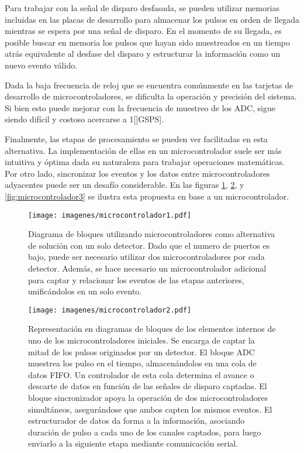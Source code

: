 \par Para trabajar con la señal de disparo desfasada, se pueden utilizar memorias incluidas en las placas de desarrollo para almacenar los pulsos en orden de llegada mientras se espera por una señal de disparo. En el momento de su llegada, es posible buscar en memoria los pulsos que hayan sido muestreados en un tiempo atrás equivalente al desfase del disparo y estructurar la información como un nuevo evento válido.

\par Dada la baja frecuencia de reloj que se encuentra comúnmente en las tarjetas de desarrollo de microcontroladores, se dificulta la operación y precisión del sistema. Si bien esto puede mejorar con la frecuencia de muestreo de los ADC, sigue siendo difícil y costoso acercarse a 1[]GSPS].

\par Finalmente, las etapas de procesamiento se pueden ver facilitadas en esta alternativa. La implementación de ellas en un microcontrolador suele ser más intuitiva y óptima dada su naturaleza para trabajar operaciones matemáticas. Por otro lado, sincronizar los eventos y los datos entre microcontroladores adyacentes puede ser un desafío considerable. En las figuras \ref{fig:microcontrolador1}, \ref{fig:microcontrolador2}, y \ref{fig:microcontrolador3} se ilustra esta propuesta en base a un microcontrolador.

\begin{figure}[H]
	\centering
	\texttt{[image: imagenes/microcontrolador1.pdf]}
	\caption{Diagrama de bloques utilizando microcontroladores como alternativa de solución con un solo detector. Dado que el numero de puertos es bajo, puede ser necesario utilizar dos microcontroladores por cada detector. Además, se hace necesario un microcontrolador adicional para captar y relacionar los eventos de las etapas anteriores, unificándolos en un solo evento.}
	\label{fig:microcontrolador1}
\end{figure}

\begin{figure}[H]
	\centering
	\texttt{[image: imagenes/microcontrolador2.pdf]}
	\caption{Representación en diagramas de bloques de los elementos internos de uno de los microcontroladores iniciales. Se encarga de captar la mitad de los pulsos originados por un detector. El bloque ADC muestrea los pulso en el tiempo, almacenándolos en una cola de datos FIFO. Un controlador de esta cola determina el avance o descarte de datos en función de las señales de disparo captadas. El bloque sincronizador apoya la operación de dos microcontroladores simultáneos, asegurándose que ambos capten los mismos eventos. El estructurador de datos da forma a la información, asociando duración de pulso a cada uno de los canales captados, para luego enviarlo a la siguiente etapa mediante comunicación serial.}
	\label{fig:microcontrolador2}
\end{figure}

